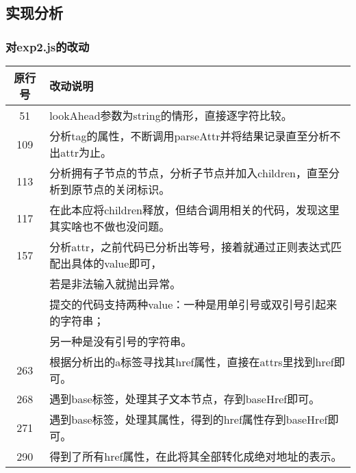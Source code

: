 \documentclass[a4paper]{article}
\begin{document}
\begin{CJK*}{UTF8}{gbsn}
    \subsection{实现分析}
    \subsubsection{对exp2.js的改动}
    \noindent\begin{tabular}
        {c|l}
        \hline
        原行号 & 改动说明\\
        \hline
        51 & lookAhead参数为string的情形，直接逐字符比较。\\
        \hline
        109 & 分析tag的属性，不断调用parseAttr并将结果记录直至分析不出attr为止。\\
        \hline
        113 & 分析拥有子节点的节点，分析子节点并加入children，直至分析到原节点的关闭标识。\\
        \hline
        117 & 在此本应将children释放，但结合调用相关的代码，发现这里其实啥也不做也没问题。\\
        \hline
        157 & 分析attr，之前代码已分析出等号，接着就通过正则表达式匹配出具体的value即可，\\
        &若是非法输入就抛出异常。\\
        & 提交的代码支持两种value：一种是用单引号或双引号引起来的字符串；\\&另一种是没有引号的字符串。\\
        \hline
        263 & 根据分析出的a标签寻找其href属性，直接在attrs里找到href即可。\\
        \hline
        268 & 遇到base标签，处理其子文本节点，存到baseHref即可。\\
        \hline
        271 & 遇到base标签，处理其属性，得到的href属性存到baseHref即可。\\
        \hline
        290 & 得到了所有href属性，在此将其全部转化成绝对地址的表示。\\
        \hline
    \end{tabular}


\end{CJK*}
\end{document}
